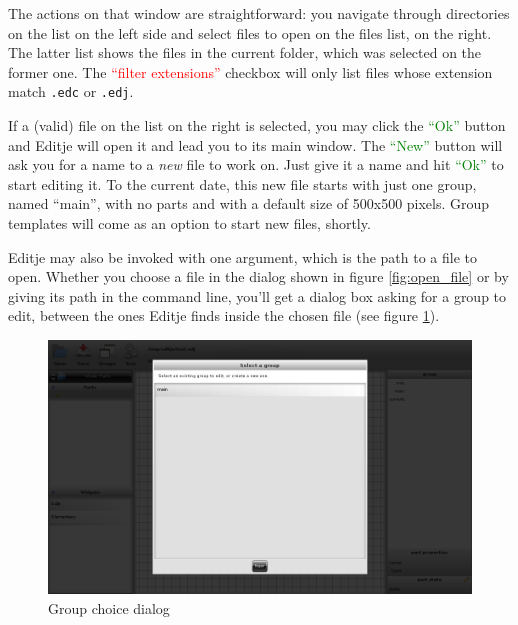 \documentclass[a4paper]{profusion}
\newcommand{\GUICheckbox}[1]{\textcolor{red}{#1}}
\newcommand{\GUIButton}[1]{\textcolor{green}{#1}} %
\begin{document}
The actions on that window are straightforward: you navigate through
directories on the list on the left side and select files to open on
the files list, on the right. The latter list shows the files in the
current folder, which was selected on the former one. The
\GUICheckbox{``filter extensions''} checkbox will only list files
whose extension match \texttt{.edc} or \texttt{.edj}.

If a (valid) file on the list on the right is selected, you may click
the \GUIButton{``Ok''} button and Editje will open it and lead you to
its main window. The \GUIButton{``New''} button will ask you for a
name to a \emph{new} file to work on. Just give it a name and hit
\GUIButton{``Ok''} to start editing it. To the current date, this new
file starts with just one group, named ``main'', with no parts and
with a default size of 500x500 pixels. Group templates will come as an
option to start new files, shortly.


Editje may also be invoked with one argument, which is the path to a
file to open. Whether you choose a file in the dialog shown in figure
\ref{fig:open_file} or by giving its path in the command line, you'll
get a dialog box asking for a group to edit, between the ones Editje
finds inside the chosen file (see figure \ref{fig:choose_group}).

\begin{figure}[h!]
  \centering
  \includegraphics[width=1.0\textwidth]{images/choose_group.png}
  \caption{Group choice dialog}
  \label{fig:choose_group}
\end{figure}
\end{document}
